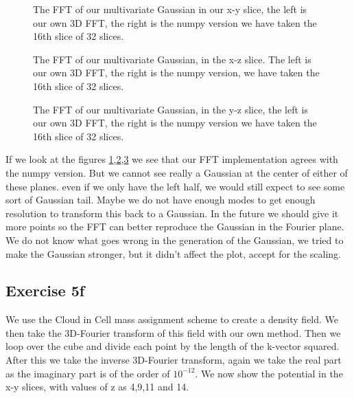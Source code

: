 \begin{figure}
    \centering
    \qquad
    \caption{The FFT of our multivariate Gaussian in our x-y slice, the left is our own 3D FFT, the right is the numpy version we have taken the 16th slice of 32 slices.}
    \label{3dfftxy}
  \end{figure}
  
  \begin{figure}
    \centering
    \qquad
    \caption{The FFT of our multivariate Gaussian, in the x-z slice. The left is our own 3D FFT, the right is the numpy version, we have taken the 16th slice of 32 slices.}
    \label{3dfftxz}
  \end{figure}
  
  \begin{figure}
    \centering
    \qquad
    \caption{The FFT of our multivariate Gaussian, in the y-z slice, the left is our own 3D FFT, the right is the numpy version we have taken the 16th slice of 32 slices.}
    \label{3dfftyz}
  \end{figure}
 If we look at the figures \ref{3dfftxy},\ref{3dfftxz},\ref{3dfftyz} we see that our FFT implementation agrees with the numpy version. But we cannot see really a Gaussian at the center of either of these planes. even if we only have the left half, we would still expect to see some sort of Gaussian tail. Maybe we do not have enough modes to get enough resolution to transform this back to a Gaussian. In the future we should give it more points so the FFT can better reproduce the Gaussian in the Fourier plane. We do not know what goes wrong in the generation of the Gaussian, we tried to make the Gaussian stronger, but it didn't affect the plot, accept for the scaling.

\subsection{Exercise 5f}
We use the Cloud in Cell mass assignment scheme to create a density field. We then take the 3D-Fourier transform of this field with our own method. Then we loop over the cube and divide each point by the length of the k-vector squared. After this we take the inverse 3D-Fourier transform, again we take the real part as the imaginary part is of the order of $10^{-12}$. We now show the potential in the x-y slices, with values of z as 4,9,11 and 14.

